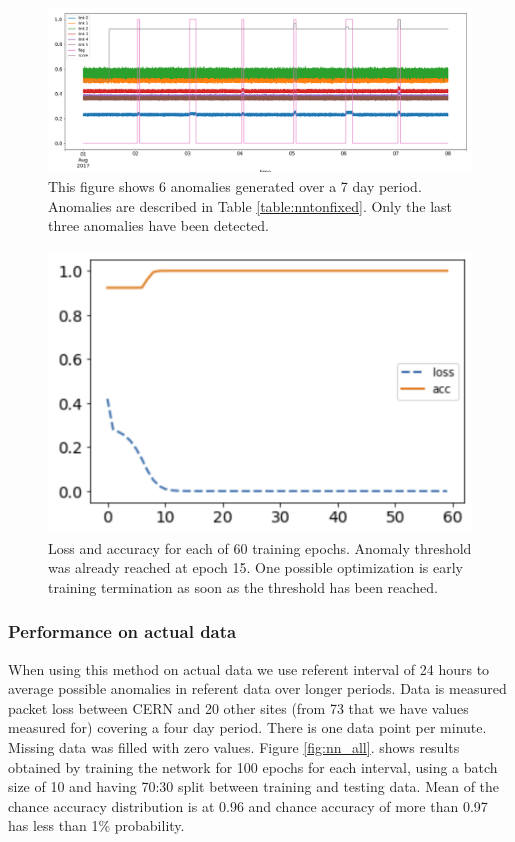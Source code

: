 \documentclass[5p]{elsarticle}
\begin{document}
\begin{figure}[htbp]
    \centering
    \includegraphics[width=\linewidth]{nn_with_auc.png}
    \caption{This figure shows 6 anomalies generated over a 7 day period. Anomalies are described in Table \ref{table:nntonfixed}. Only the last three anomalies have been detected.}
    \label{fig:nnonfixed}
\end{figure}

\begin{figure}[htbp]
    \centering
    \includegraphics[width=0.8\linewidth]{nn_epochs.png}
    \caption{Loss and accuracy for each of 60 training epochs. Anomaly threshold was already reached at epoch 15. One possible optimization is early training termination as soon as the threshold has been reached. }
    \label{fig:loss}
\end{figure}


\subsubsection{Performance on actual data}

When using this method on actual data we use referent interval of 24 hours to average possible anomalies in referent data over longer periods. Data is measured packet loss between CERN and 20 other sites (from 73 that we have values measured for) covering a four day period. There is one data point per minute. Missing data was filled with zero values. Figure \ref{fig:nn_all}. shows results obtained by training the network for 100 epochs for each interval, using a batch size of 10 and having 70:30 split between training and testing data. Mean of the chance accuracy distribution is at 0.96 and chance accuracy of more than 0.97 has less than 1\% probability. 
\end{document}
